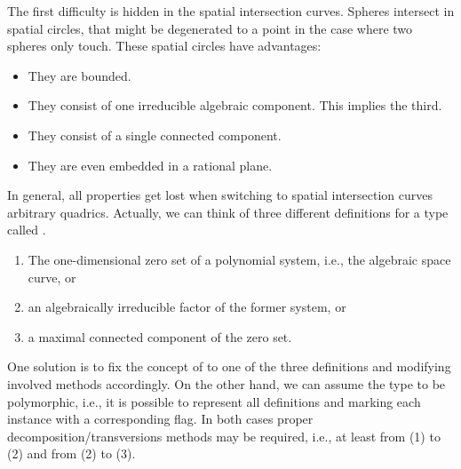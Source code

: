 The first difficulty is hidden in the spatial intersection curves.
Spheres intersect in spatial circles, that might be degenerated
to a point in the case where two spheres only touch. These spatial circles
have advantages: 
\begin{itemize}
\item They are bounded. 
\item They consist of one irreducible algebraic component. This implies the 
third.
\item They consist of a single connected component.
\item They are even embedded in a rational plane.
\end{itemize}
In general, all properties get lost when switching to spatial 
intersection curves arbitrary quadrics.
Actually, we can think of three different definitions for
a type called .
\begin{enumerate}
\item The one-dimensional zero set of a polynomial
system, i.e., the algebraic space curve, or 
\item an algebraically irreducible factor of the former system, or 
\item a maximal connected component
of the zero set.
\end{enumerate}
One solution is to fix the concept of  to one of the
three definitions and modifying involved methods accordingly.
On the other hand, we can assume the type to be 
polymorphic, i.e., it is possible
to represent all definitions and marking each instance with a corresponding
flag. In both cases proper decomposition/transversions
methods may be required, i.e., at least from (1) to (2) and from (2) to (3).



